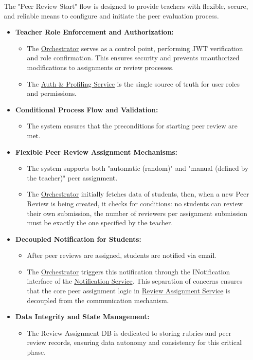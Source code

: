 \begin{justify}
    The "Peer Review Start" flow is designed to provide teachers with flexible, secure, and reliable means to configure and initiate the peer evaluation process.
\end{justify}
\begin{itemize}
    \item \textbf{Teacher Role Enforcement and Authorization:}
    \begin{itemize}
        \item The \hyperref[def:Orchestrator]{Orchestrator} serves as a control point, performing JWT verification and role confirmation. This ensures security and prevents unauthorized modifications to assignments or review processes.
        
        \item The \hyperref[def:AuthProfilingService]{Auth \& Profiling Service} is the single source of truth for user roles and permissions. 
    \end{itemize}
    \item \textbf{Conditional Process Flow and Validation:}
    \begin{itemize}
        \item The system ensures that the preconditions for starting peer review are met. 
    \end{itemize}
    \item \textbf{Flexible Peer Review Assignment Mechanisms:}
    \begin{itemize}
        \item The system supports both "automatic (random)" and "manual (defined by the teacher)" peer assignment.
        \item The \hyperref[def:Orchestrator]{Orchestrator} initially fetches data of students, then, when a new Peer Review is being created, it checks for conditions: no students can review their own submission, the number of reviewers per assignment submission must be exactly the one specified by the teacher.
    \end{itemize}
    \item \textbf{Decoupled Notification for Students:}
    \begin{itemize}
        \item After peer reviews are assigned, students are notified via email.
        \item The \hyperref[def:Orchestrator]{Orchestrator} triggers this notification through the INotification interface of the \hyperref[def:NotificationService]{Notification Service}. This separation of concerns ensures that the core peer assignment logic in \hyperref[def:ReviewAssignmentService]{Review Assignment Service} is decoupled from the communication mechanism.
    \end{itemize}
    \item \textbf{Data Integrity and State Management:}
    \begin{itemize}
        \item The Review Assignment DB is dedicated to storing rubrics and peer review records, ensuring data autonomy and consistency for this critical phase.
    \end{itemize}
\end{itemize}


